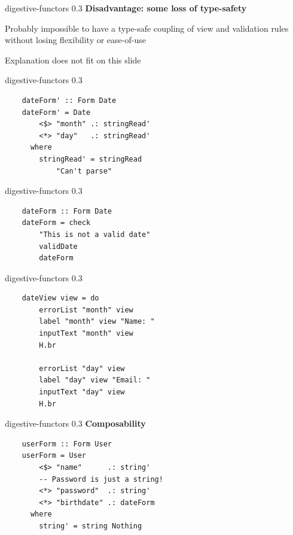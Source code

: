 \documentclass[20pt]{beamer}
\newcommand{\vspaced}{
    \vspace{5mm}
}
\begin{document}
\begin{frame}{digestive-functors 0.3}
    \textbf{Disadvantage: some loss of type-safety} \\
    \vspaced
    Probably impossible to have a type-safe coupling of view and validation
    rules without losing flexibility or ease-of-use \\
    \vspaced
    Explanation does not fit on this slide \\
\end{frame}

\begin{frame}[fragile]{digestive-functors 0.3}
    \begin{lstlisting}
    dateForm' :: Form Date
    dateForm' = Date
        <$> "month" .: stringRead'
        <*> "day"   .: stringRead'
      where
        stringRead' = stringRead
            "Can't parse"
    \end{lstlisting}
\end{frame}

\begin{frame}[fragile]{digestive-functors 0.3}
    \begin{lstlisting}
    dateForm :: Form Date
    dateForm = check
        "This is not a valid date"
        validDate
        dateForm
    \end{lstlisting}
\end{frame}

\begin{frame}[fragile]{digestive-functors 0.3}
    \begin{lstlisting}
    dateView view = do
        errorList "month" view
        label "month" view "Name: "
        inputText "month" view
        H.br

        errorList "day" view
        label "day" view "Email: "
        inputText "day" view
        H.br
    \end{lstlisting}
\end{frame}

\begin{frame}[fragile]{digestive-functors 0.3}
    \textbf{Composability} \\
    \vspaced
    \begin{lstlisting}
    userForm :: Form User
    userForm = User
        <$> "name"      .: string'
        -- Password is just a string!
        <*> "password"  .: string'
        <*> "birthdate" .: dateForm
      where
        string' = string Nothing
    \end{lstlisting}
\end{frame}
\end{document}
